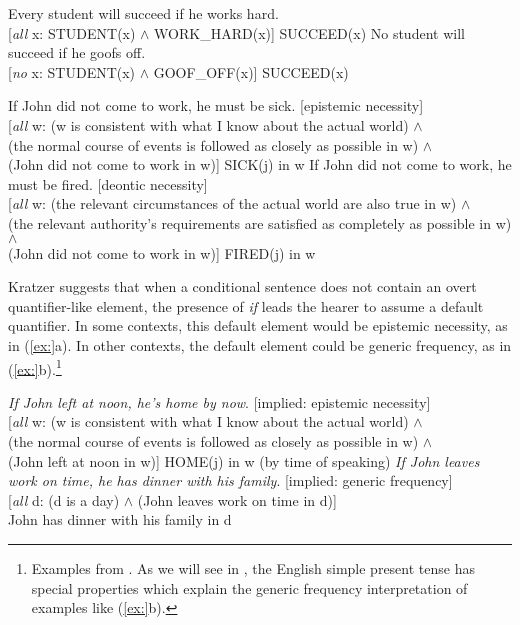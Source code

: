 \ea
\ea  Every student will succeed if he works hard.\\
{}[\textit{all} x: STUDENT(x) $\wedge$ WORK\_HARD(x)] SUCCEED(x)
\ex  No student will succeed if he goofs off.\\
{}[\textit{no} x: STUDENT(x) $\wedge$ GOOF\_OFF(x)] SUCCEED(x)
\z \z

\ea
\ea  If John did not come to work, he must be sick.  [epistemic necessity]\\
  {}[\textit{all} w: (w is consistent with what I know about the actual world) $\wedge$\\
  (the normal course of events is followed as closely as possible in w) $\wedge$\\
  (John did not come to work in w)] SICK(j) in w
\ex  If John did not come to work, he must be fired.  [deontic necessity]\\
  {}[\textit{all} w: (the relevant circumstances of the actual world are also true in w) $\wedge$\\
  (the relevant authority’s requirements are satisfied as completely as possible in w) $\wedge$\\
  (John did not come to work in w)] FIRED(j) in w
\z \z


Kratzer suggests that when a conditional sentence does not contain an overt quantifier-like element, the presence of \textit{if} leads the hearer to assume a default quantifier. In some contexts, this default element would be epistemic necessity, as in (\ref{ex:}a). In other contexts, the default element could be generic frequency, as in (\ref{ex:}b).\footnote{Examples from . As we will see in , the English simple present tense has special properties which explain the generic frequency interpretation of examples like (\ref{ex:}b).}


\ea
\ea \textit{If John left at noon, he’s home by now}.   [implied: epistemic necessity]\\
  {}[\textit{all} w: (w is consistent with what I know about the actual world) $\wedge$\\
  (the normal course of events is followed as closely as possible in w) $\wedge$\\
  (John left at noon in w)] HOME(j) in w (by time of speaking)
\ex \textit{If John leaves work on time, he has dinner with his family}. [implied: generic frequency]\\
  {}[\textit{all} d: (d is a day) $\wedge$ (John leaves work on time in d)]\\
    John has dinner with his family in d
\z \z



